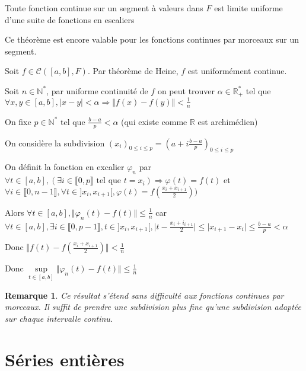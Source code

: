\documentclass[a4paper,12pt]{book}
\newcommand{\Thr}[2]{\begin{tcolorbox}[sharp corners, colback=white,colframe=red!90!black!75, title=Théorème : #1]#2\end{tcolorbox}}
\newcommand{\Pre}[1]{\begin{tcolorbox}[sharp corners, colback=white,colframe=green!60!green!30!black!75, title=Preuve]#1\end{tcolorbox}}
\newtheorem{Rem}{Remarque}[section]
\def\R{\mathbb{R}}
\def\N{\mathbb{N}}
\begin{document}
\Thr{Approximmation uniforme par des fonctions en escalier}{Toute fonction continue sur un segment à valeurs dans $F$ est limite uniforme d'une suite de fonctions en escaliers \par Ce théorème est encore valable pour les fonctions continues par morceaux sur un segment.}
\Pre{Soit $f\in\mathcal{C}([a,b],F)$. Par théorème de Heine, $f$ est uniformément continue. \par Soit $n\in\N^*$, par uniforme continuité de $f$ on peut trouver $\alpha\in\R_+^*$ tel que $\forall x,y\in[a,b], \vert x-y\vert<\alpha\Rightarrow \Vert f(x)-f(y)\Vert < \frac{1}{n}$
\par On fixe $p\in\N^*$ tel que $\frac{b-a}{p}<\alpha$ (qui existe comme $\R$ est archimédien) \par On considère la subdivision $(x_i)_{0\leq i\leq p} = \left(a+i\frac{b-a}{p}\right)_{0\leq i\leq p}$ \par On définit la fonction en excalier $\varphi_n$ par $\forall t\in [a,b], (\exists i\in\llbracket 0,p\rrbracket \text{ tel que } t=x_i) \Rightarrow \varphi(t)=f(t)$ et $\forall i\in\llbracket 0,n-1\rrbracket,\forall t\in]x_i,x_{i+1}[, \varphi(t) = f\left(\frac{x_{i}+x_{i+1}}{2}\right))$
\par Alors $\forall t\in[a,b], \Vert \varphi_n(t)-f(t)\Vert\leq \frac{1}{n}$ car $\forall t\in[a,b],\exists i\in\llbracket 0,p-1\rrbracket, t\in ]x_{i}, x_{i+1}[, \vert t-\frac{x_i+i_{i+1}}{2}\vert\leq \vert x_{i+1}-x_i\vert \leq \frac{b-a}{p}< \alpha$ \par Donc $\Vert f(t)-f\left(\frac{x_i+x_{i+1}}{2}\right)\Vert<\frac{1}{n}$
\par Donc $\sup\limits_{t\in [a,b]}\Vert\varphi_n(t)-f(t)\Vert\leq \frac{1}{n}$}
\begin{Rem}
Ce résultat s'étend sans difficulté aux fonctions continues par morceaux. Il suffit de prendre une subdivision plus fine qu'une subdivision adaptée sur chaque intervalle continu.
\end{Rem}



\chapter{Séries entières}
\end{document}
